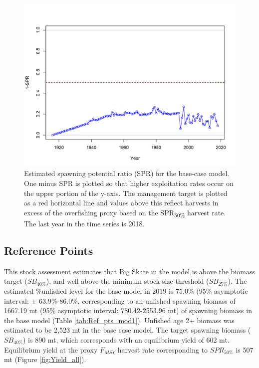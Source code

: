 \documentclass[12pt,]{article}
\begin{document}
\FloatBarrier

\begin{figure}
\centering
\includegraphics{r4ss/plots_mod1/SPR2_minusSPRseries.png}
\caption{Estimated spawning potential ratio (SPR) for the base-case
model. One minus SPR is plotted so that higher exploitation rates occur
on the upper portion of the y-axis. The management target is plotted as
a red horizontal line and values above this reflect harvests in excess
of the overfishing proxy based on the SPR\textsubscript{50\%} harvest
rate. The last year in the time series is 2018. \label{fig:SPR_all}}
\end{figure}

\FloatBarrier

\hypertarget{reference-points}{%
\subsection*{Reference Points}\label{reference-points}}

This stock assessment estimates that Big Skate in the model is above the
biomass target (\(SB_{40\%}\)), and well above the minimum stock size
threshold (\(SB_{25\%}\)). The estimated \%unfished level for the base
model in 2019 is 75.0\% (95\% asymptotic interval: \(\pm\)
63.9\%-86.0\%, corresponding to an unfished spawning biomass of 1667.19
mt (95\% asymptotic interval: 780.42-2553.96 mt) of spawning biomass in
the base model (Table \ref{tab:Ref_pts_mod1}). Unfished age 2+ biomass
was estimated to be 2,523 mt in the base case model. The target spawning
biomass (\(SB_{40\%}\)) is 890 mt, which corresponds with an equilibrium
yield of 602 mt. Equilibrium yield at the proxy \(F_{MSY}\) harvest rate
corresponding to \(SPR_{50\%}\) is 507 mt (Figure \ref{fig:Yield_all}).
\end{document}
